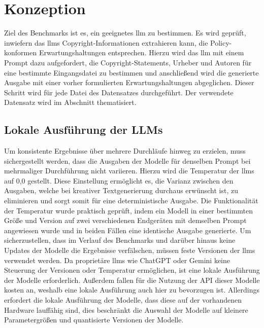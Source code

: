 \section{Konzeption}\label{sec:konzeption-benchmark}

Ziel des Benchmarks ist es, ein geeignetes \gls{llm} zu bestimmen.
Es wird geprüft, inwiefern das \glspl{llm} Copyright-Informationen extrahieren kann, die Policy-konformen Erwartungshaltungen entsprechen.
Hierzu wird das \gls{llm} mit einem Prompt dazu aufgefordert, die Copyright-Statements, Urheber und Autoren für eine bestimmte Eingangsdatei zu bestimmen und anschließend wird die generierte Ausgabe mit einer vorher formulierten Erwartungshaltungen abgeglichen.
Dieser Schritt wird für jede Datei des Datensatzes durchgeführt.
Der verwendete Datensatz wird im Abschnitt  thematisiert.

\subsection{Lokale Ausführung der LLMs}\label{subsec:lokale-ausfuehrung}

Um konsistente Ergebnisse über mehrere Durchläufe hinweg zu erzielen, muss sichergestellt werden, dass die Ausgaben der Modelle für denselben Prompt bei mehrmaliger Durchführung nicht variieren.
Hierzu wird die Temperatur der \glspl{llm} auf 0,0 gestellt.
Diese Einstellung ermöglicht es, die Varianz zwischen den Ausgaben, welche bei kreativer Textgenerierung durchaus erwünscht ist, zu eliminieren und sorgt somit für eine deterministische Ausgabe.
Die Funktionalität der Temperatur wurde praktisch geprüft, indem ein Modell in einer bestimmten Größe und Version auf zwei verschiedenen Endgeräten mit demselben Prompt angewiesen wurde und in beiden Fällen eine identische Ausgabe generierte.
Um sicherzustellen, dass im Verlauf des Benchmarks und darüber hinaus keine Updates der Modelle die Ergebnisse verfälschen, müssen feste Versionen der \glspl{llm} verwendet werden.
Da proprietäre \glspl{llm} wie ChatGPT oder Gemini keine Steuerung der Versionen oder Temperatur ermöglichen, ist eine lokale Ausführung der Modelle erforderlich.
Außerdem fallen für die Nutzung der API dieser Modelle kosten an, weshalb eine lokale Ausführung auch hier zu bevorzugen ist.
Allerdings erfordert die lokale Ausführung der Modelle, dass diese auf der vorhandenen Hardware lauffähig sind, dies beschränkt die Auswahl der Modelle auf kleinere Parametergrößen und quantisierte Versionen der Modelle.

